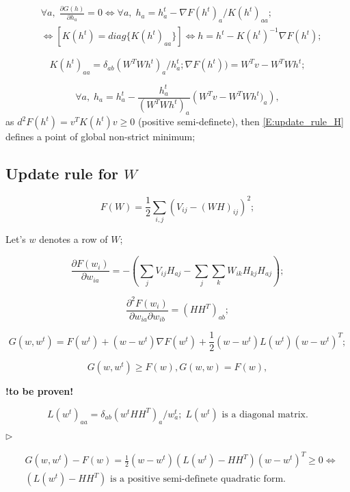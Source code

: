 \documentclass[oneside, final, 14pt]{extarticle}
\begin{document}
\begin{align*}
  &\forall a, \; \frac{\partial G(h)}{\partial h_a} = 0
    \iff
    \forall a, \; h_a = h_a^t - \nabla F(h^t)_a / K(h^t)_{aa}; \\
    & \iff
    [ K(h^t) = \mathit{diag}\{K(h^t)_{aa}\} ]
    \iff
    h = h^t - K(h^t)^{-1} \nabla F(h^t);
\end{align*}

\[
  K(h^t)_{aa} = \delta_{ab} (W^T W h^t)_a / h^t_a;
  \nabla F(h^t)) = W^T v - W^T W h^t;
\]

\begin{equation}\label{E:update_rule_H}
  \forall a, \; h_a = h_a^t - \frac{h^t_a}{(W^T W h^t)_a}
    \left( W^T v - W^T W h^t)_a \right),
\end{equation}
as $d^2 F(h^t) = v^T K(h^t) v \geqslant 0$ (positive semi-definete),
then \eqref{E:update_rule_H} defines a point of
global non-strict minimum;

\subsection{Update rule for $W$}

\[
  F(W) = \frac{1}{2} \sum_{i,j} \left(
    V_{ij} - (W H)_{ij}
  \right)^2;
\]

Let's $w$ denotes a row of $W$;

\[
  \frac{\partial F(w_i)}{\partial w_{ia}} =
    -\left(
      \sum_j V_{ij} H_{aj}
      - \sum_j \sum_k W_{ik} H_{kj} H_{aj}
    \right);
\]

\[
  \frac{\partial^2 F(w_i)}{\partial w_{ia} \partial w_{ib}}
  = (H H^T)_{ab};
\]

\[
  G(w, w^t) = F(w^t) + (w - w^t) \nabla F(w^t)
    + \frac{1}{2} (w - w^t) L(w^t) (w - w^t)^T;
\]

\[
  G(w, w^t) \geqslant F(w), G(w, w) = F(w),
\]
\begin{center} \bf !to be proven! \end{center}

\[
  L(w^t)_{aa} = \delta_{ab} (w^t H H^T)_a / w_a^t; \;
  L(w^t) \text{ is a diagonal matrix.}
\]

$\rhd$

\begin{align*}
  & G(w, w^t) - F(w) =
    \frac{1}{2} (w - w^t) (L(w^t) - H H^T) (w - w^t)^T \geqslant 0
  \iff \\
  & (L(w^t) - H H^T) \text{ is a positive semi-definete quadratic form.}
\end{align*}
\end{document}
